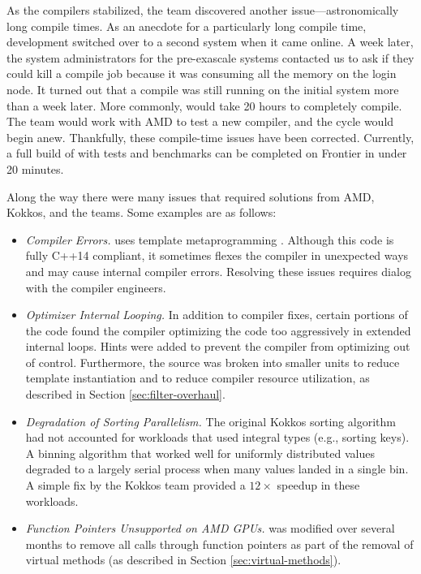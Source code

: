 As the compilers stabilized, the team discovered another issue---astronomically long compile times.
As an anecdote for a particularly long compile time, \vtkm development switched over to a second system when it came online.
A week later, the system administrators for the pre-exascale systems contacted us to ask if they could kill a compile job because it was consuming all the memory on the login node.
It turned out that a \vtkm compile was still running on the initial system more than a week later.
More commonly, \vtkm would take 20 hours to completely compile.
The team would work with AMD to test a new compiler, and the cycle would begin anew.
Thankfully, these compile-time issues have been corrected.
Currently, a full build of \vtkm with tests and benchmarks can be completed on Frontier in under 20 minutes.

Along the way there were many issues that required solutions from AMD, Kokkos, and the \vtkm teams. Some examples are as follows:
\begin{itemize}
\item \emph{Compiler Errors.}
  \vtkm uses template metaprogramming \citep{Meyers2005}.
  Although this code is fully C++14 compliant, it sometimes flexes the compiler in unexpected ways and may cause internal compiler errors.
  Resolving these issues requires dialog with the compiler engineers.
\item \emph{Optimizer Internal Looping.}
  In addition to compiler fixes, certain portions of the code found the compiler optimizing the code too aggressively in extended internal loops.
  Hints were added to prevent the compiler from optimizing out of control.
  Furthermore, the \vtkm source was broken into smaller units to reduce template instantiation and to reduce compiler resource utilization, as described in Section \ref{sec:filter-overhaul}.
\item \emph{Degradation of Sorting Parallelism.}
  The original Kokkos sorting algorithm had not accounted for \vtkm workloads that used integral types (e.g., sorting keys).
  A binning algorithm that worked well for uniformly distributed values degraded to a largely serial process when many values landed in a single bin.
  A simple fix by the Kokkos team provided a $12\times$ speedup in these workloads.
\item \emph{Function Pointers Unsupported on AMD GPUs.}
  \vtkm was modified over several months to remove all calls through function pointers as part of the removal of virtual methods (as described in Section \ref{sec:virtual-methods}).
\end{itemize}

